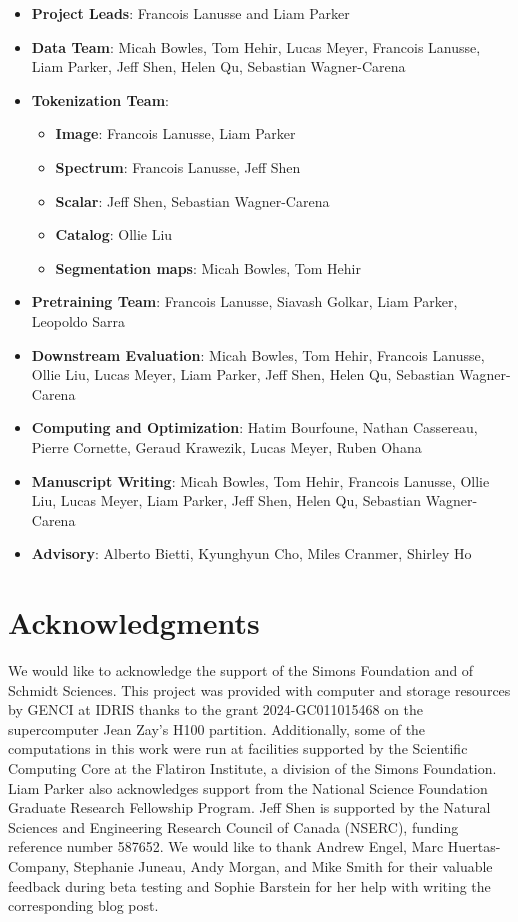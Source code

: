 \documentclass[]{polymathic}
\begin{document}
\begin{itemize}
    \item \textbf{Project Leads}: Francois Lanusse and Liam Parker
    \item \textbf{Data Team}: Micah Bowles, Tom Hehir, Lucas Meyer, Francois Lanusse, Liam Parker, Jeff Shen, Helen Qu, Sebastian Wagner-Carena
    \item \textbf{Tokenization Team}:
    \begin{itemize}
        \item \textbf{Image}: Francois Lanusse, Liam Parker
        \item \textbf{Spectrum}: Francois Lanusse, Jeff Shen
        \item \textbf{Scalar}: Jeff Shen, Sebastian Wagner-Carena
        \item \textbf{Catalog}: Ollie Liu
        \item \textbf{Segmentation maps}: Micah Bowles, Tom Hehir
    \end{itemize}
    \item \textbf{Pretraining Team}: Francois Lanusse, Siavash Golkar, Liam Parker, Leopoldo Sarra
    \item \textbf{Downstream Evaluation}: Micah Bowles, Tom Hehir, Francois Lanusse, Ollie Liu, Lucas Meyer, Liam Parker, Jeff Shen, Helen Qu, Sebastian Wagner-Carena
    \item \textbf{Computing and Optimization}: Hatim Bourfoune, Nathan Cassereau, Pierre Cornette, Geraud Krawezik, Lucas Meyer, Ruben Ohana
    \item \textbf{Manuscript Writing}: Micah Bowles, Tom Hehir, Francois Lanusse, Ollie Liu, Lucas Meyer, Liam Parker, Jeff Shen, Helen Qu, Sebastian Wagner-Carena
    \item \textbf{Advisory}: Alberto Bietti, Kyunghyun Cho, Miles Cranmer, Shirley Ho
\end{itemize}


\section{Acknowledgments}

We would like to acknowledge the support of the Simons Foundation and of Schmidt Sciences. This project was provided with computer and storage resources by GENCI at IDRIS thanks to the grant 2024-GC011015468 on the supercomputer Jean Zay's H100 partition. Additionally, some of the computations in this work were run at facilities supported by the Scientific Computing Core at the Flatiron Institute, a division of the Simons Foundation. Liam Parker also acknowledges support from the National Science Foundation Graduate Research Fellowship Program. Jeff Shen is supported by the Natural Sciences and Engineering Research Council of Canada (NSERC), funding reference number 587652. We would like to thank Andrew Engel, Marc Huertas-Company, Stephanie Juneau, Andy Morgan, and Mike Smith for their valuable feedback during beta testing and Sophie Barstein for her help with writing the corresponding blog post.
\end{document}
